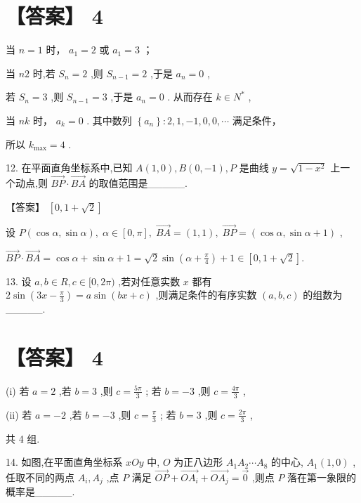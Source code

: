 \documentclass[10pt]{article}
\begin{document}
\section*{【答案】 4}

当 \(n = 1\) 时， \({a}_{1} = 2\) 或 \({a}_{1} = 3\) ；

当 \({n2}\) 时,若 \({S}_{n} = 2\) ,则 \({S}_{n - 1} = 2\) ,于是 \({a}_{n} = 0\) ,

若 \({S}_{n} = 3\) ,则 \({S}_{n - 1} = 3\) ,于是 \({a}_{n} = 0\) . 从而存在 \(k \in  {N}^{ * }\) ,

当 \({nk}\) 时， \({a}_{k} = 0\) . 其中数列 \(\left\{  {a}_{n}\right\}   : 2,1, - 1,0,0,\cdots\) 满足条件，

所以 \({k}_{\max } = 4\) .

12. 在平面直角坐标系中,已知 \(A\left( {1,0}\right) ,B\left( {0, - 1}\right) ,P\) 是曲线 \(y = \sqrt{1 - {x}^{2}}\) 上一个动点,则 \(\overrightarrow{BP} \cdot  \overrightarrow{BA}\) 的取值范围是\_\_\_\_\_.

【答案】 \(\left\lbrack  {0,1 + \sqrt{2}}\right\rbrack\)

设 \(P\left( {\cos \alpha ,\sin \alpha }\right) ,\;\alpha  \in  \left\lbrack  {0,\pi }\right\rbrack  ,\;\overrightarrow{BA} = \left( {1,1}\right) ,\;\overrightarrow{BP} = \left( {\cos \alpha ,\sin \alpha  + 1}\right)\) ,

\(\overrightarrow{BP} \cdot  \overrightarrow{BA} = \cos \alpha  + \sin \alpha  + 1 = \sqrt{2}\sin \left( {\alpha  + \frac{\pi }{4}}\right)  + 1 \in  \left\lbrack  {0,1 + \sqrt{2}}\right\rbrack  .\)

13. 设 \(a,b \in  R,c \in  \lbrack 0,{2\pi })\) ,若对任意实数 \(x\) 都有 \(2\sin \left( {{3x} - \frac{\pi }{3}}\right)  = a\sin \left( {{bx} + c}\right)\) ,则满足条件的有序实数 \(\left( {a,b,c}\right)\) 的组数为\_\_\_\_\_.

\section*{【答案】 4}

(i) 若 \(a = 2\) ,若 \(b = 3\) ,则 \(c = \frac{5\pi }{3}\) ; 若 \(b =  - 3\) ,则 \(c = \frac{4\pi }{3}\) ,

(ii) 若 \(a =  - 2\) ,若 \(b =  - 3\) ,则 \(c = \frac{\pi }{3}\) ; 若 \(b = 3\) ,则 \(c = \frac{2\pi }{3}\) ,

共 4 组.

14. 如图,在平面直角坐标系 \({xOy}\) 中, \(O\) 为正八边形 \({A}_{1}{A}_{2}\cdots {A}_{8}\) 的中心, \({A}_{1}\left( {1,0}\right)\) ,任取不同的两点 \({A}_{i},{A}_{j}\) ,点 \(P\) 满足 \(\overrightarrow{OP} + \overrightarrow{O{A}_{i}} + \overrightarrow{O{A}_{j}} = \overrightarrow{0}\) ,则点 \(P\) 落在第一象限的概率是\_\_\_\_\_.
\end{document}
